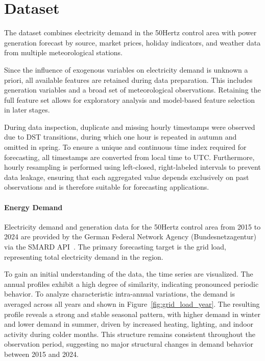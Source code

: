 \section{Dataset}
\label{sec:data}
The dataset combines electricity demand in the 50Hertz control area with power generation forecast by source, market prices, holiday indicators, and weather data from multiple meteorological stations.

Since the influence of exogenous variables on electricity demand is unknown a priori, all available features are retained during data preparation. This includes generation variables and a broad set of meteorological observations. Retaining the full feature set allows for exploratory analysis and model-based feature selection in later stages.

During data inspection, duplicate and missing hourly timestamps were observed due to \ac{DST} transitions, during which one hour is repeated in autumn and omitted in spring. To ensure a unique and continuous time index required for forecasting, all timestamps are converted from local time to \ac{UTC}. Furthermore, hourly resampling is performed using left-closed, right-labeled intervals to prevent data leakage, ensuring that each aggregated value depends exclusively on past observations and is therefore suitable for forecasting applications.

\paragraph*{Energy Demand}
Electricity demand and generation data for the 50Hertz control area from 2015 to 2024 are provided by the German Federal Network Agency (Bundesnetzagentur) via the SMARD API~\cite{bundesnetzagentur_2025_smard}. The primary forecasting target is the grid load, representing total electricity demand in the region.

To gain an initial understanding of the data, the time series are visualized. The annual profiles exhibit a high degree of similarity, indicating pronounced periodic behavior. To analyze characteristic intra-annual variations, the demand is averaged across all years and shown in Figure~\ref{fig:grid_load_year}. The resulting profile reveals a strong and stable seasonal pattern, with higher demand in winter and lower demand in summer, driven by increased heating, lighting, and indoor activity during colder months. This structure remains consistent throughout the observation period, suggesting no major structural changes in demand behavior between 2015 and 2024.


